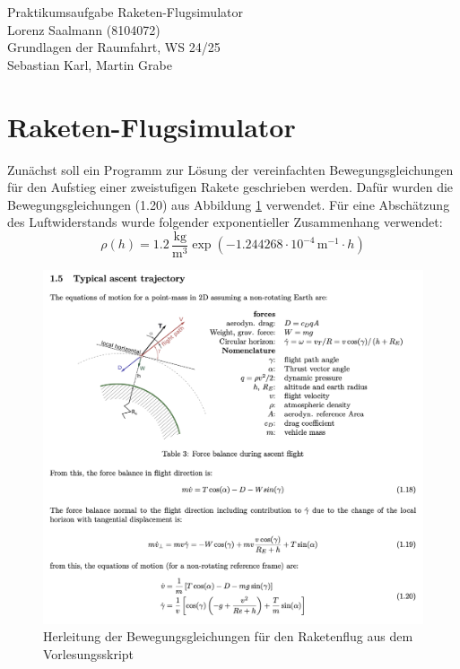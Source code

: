 \documentclass[12pt]{article}
\begin{document}
\setlength{\parindent}{0pt}


\begin{titlepage}
    \centering
    \vspace*{2cm}
    \Large{Praktikumsaufgabe Raketen-Flugsimulator} \\
    \vspace{2cm}
    \normalsize{Lorenz Saalmann (8104072)} \\
    \vfill
    \normalsize{{Grundlagen der Raumfahrt, WS 24/25}} \\
    \small{Sebastian Karl, Martin Grabe} \\
\end{titlepage}

\newpage

\section{Raketen-Flugsimulator}
Zunächst soll ein Programm zur Lösung der vereinfachten Bewegungsgleichungen für den Aufstieg einer zweistufigen Rakete geschrieben werden. Dafür wurden die Bewegungsgleichungen (1.20) aus Abbildung \ref{fig:equations} verwendet. Für eine Abschätzung des Luftwiderstands wurde folgender exponentieller Zusammenhang verwendet:
\begin{equation}
    \rho(h) = 1.2 \, \frac{\text{kg}}{\text{m}^3} \exp \left( -1.244268 \cdot 10^{-4} \, \text{m}^{-1} \cdot h \right)
\end{equation}

\begin{figure}
    \centering
    \label{fig:equations}
    \includegraphics[width=1\textwidth]{images/equations.png}
    \caption{Herleitung der Bewegungsgleichungen für den Raketenflug aus dem Vorlesungsskript}
\end{figure}
\end{document}

